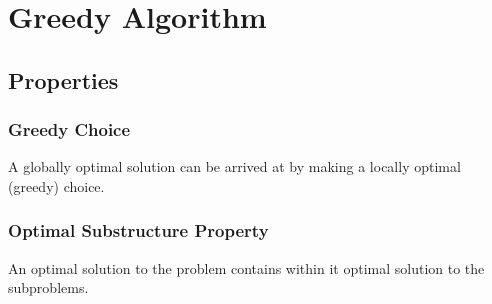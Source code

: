 \chapter{Greedy Algorithm}
\newpage

\section{Properties}

\subsection*{Greedy Choice}
A globally optimal solution can be arrived at by making a locally optimal (greedy) choice.

\subsection*{Optimal Substructure Property}
An optimal solution to the problem contains within it optimal solution to the subproblems.

\newpage



\newpage


\newpage

%
